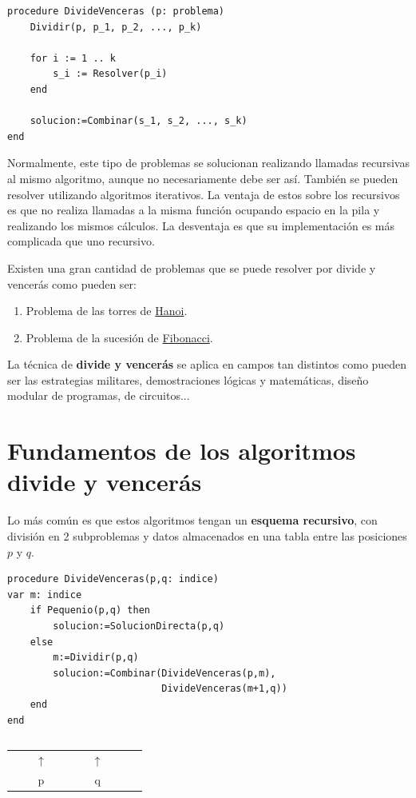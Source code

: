 \documentclass[10pt,a4paper,spanish]{report}
\theoremstyle{definition}
\theoremstyle{remark}
\begin{document}
\begin{verbatim}
procedure DivideVenceras (p: problema)
    Dividir(p, p_1, p_2, ..., p_k)
    
    for i := 1 .. k
        s_i := Resolver(p_i)
    end
    
    solucion:=Combinar(s_1, s_2, ..., s_k)
end
\end{verbatim}

Normalmente, este tipo de problemas se solucionan realizando llamadas recursivas al mismo algoritmo, aunque no necesariamente debe ser así. También se pueden resolver utilizando algoritmos iterativos. La ventaja de estos sobre los recursivos es que no realiza llamadas a la misma función ocupando espacio en la pila y realizando los mismos cálculos. La desventaja es que su implementación es más complicada que uno recursivo.

Existen una gran cantidad de problemas que se puede resolver por divide y vencerás como pueden ser:

\begin{enumerate}[$\star$]
    \item Problema de las torres de \hyperref[hanoi]{Hanoi}.
    \item Problema de la sucesión de \hyperref[fibonacci_recursivo]{Fibonacci}.
\end{enumerate}

La técnica de \textbf{\textcolor[rgb]{0.2,0.5,0.5}divide y vencerás} se aplica en campos tan distintos como pueden ser las estrategias militares, demostraciones lógicas y matemáticas, diseño modular de programas, de circuitos...

\section{\textcolor[rgb]{0.2,0.5,0.5}Fundamentos de los algoritmos divide y vencerás}

Lo más común es que estos algoritmos tengan un \textbf{\textcolor[rgb]{0.2,0.5,0.5}{esquema recursivo}}, con división en 2 subproblemas y datos almacenados en una tabla entre las posiciones $p$ y $q$.

\begin{verbatim}
procedure DivideVenceras(p,q: indice)
var m: indice
    if Pequenio(p,q) then
        solucion:=SolucionDirecta(p,q)
    else
        m:=Dividir(p,q)
        solucion:=Combinar(DivideVenceras(p,m),
                           DivideVenceras(m+1,q))
    end
end
\end{verbatim}
\begin{center}
\begin{tabular}{|c|c|c|c|c|c|c|c|c|c|c|}
\hline
&&&&&&&&&&\\
\hline
\end{tabular}
\end{center}
\begin{center}
\begin{tabular}{cccccccccc}
&&$\mathbf{\uparrow}$&&&&$\mathbf{\uparrow}$&&\\
&&p&&&&q&&\\
\end{tabular}
\end{center}
\end{document}
